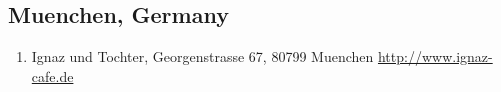 \subsection{Muenchen, Germany}
\begin{enumerate}
 \item Ignaz und Tochter, Georgenstrasse 67, 80799 Muenchen \href{http://www.ignaz-cafe.de}{http://www.ignaz-cafe.de}
\end{enumerate}
